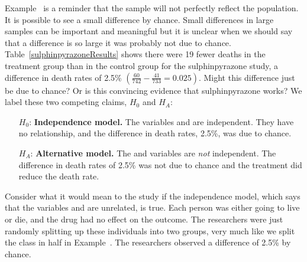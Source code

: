 Example~ is a reminder that the sample will not perfectly reflect the population. It is possible to see a small difference by chance. Small differences in large samples can be important and meaningful but it is unclear when we should say that a difference is so large it was probably not due to chance. %
Table~\ref{sulphinpyrazoneResults} shows there were 19 fewer deaths in the treatment group than in the control group for the sulphinpyrazone study, a difference in death rates of 2.5\% $\left( \frac{60}{742} - \frac{41}{733} = 0.025 \right)$. %
Might this difference just be due to chance? Or is this convincing evidence that sulphinpyrazone works? We label these two competing claims, $H_0$ and $H_A$:
\begin{itemize}
\setlength{\itemsep}{0mm}
\item[$H_0$:] \textbf{Independence model.} The variables  and  are independent. They have no relationship, and the difference in death rates, 2.5\%, was due to chance.
\item[$H_A$:] \textbf{Alternative model.} The  and  variables are \emph{not} independent. The difference in death rates of 2.5\% was not due to chance and the treatment did reduce the death rate.
\end{itemize}


Consider what it would mean to the study if the independence model, which says that the variables  and  are unrelated, is true. Each person was either going to live or die, and the drug had no effect on the outcome. The researchers were just randomly splitting up these individuals into two groups, very much like we split the class in half in Example~. The researchers observed a difference of 2.5\% by chance.

